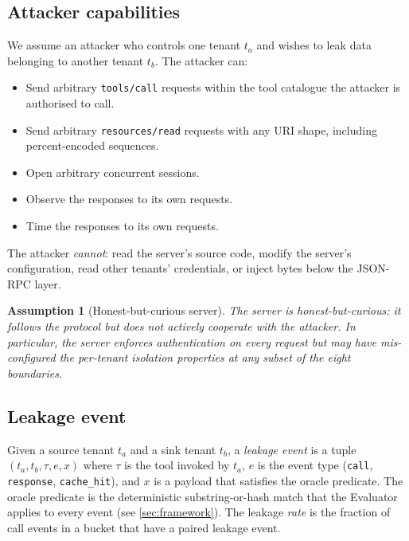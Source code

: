 \documentclass[sigconf, anonymous, natbib=false]{acmart}
\newtheorem{assumption}{Assumption}
\begin{document}
\subsection{Attacker capabilities}

We assume an attacker who controls one tenant $t_a$ and
wishes to leak data belonging to another tenant $t_b$. The
attacker can:

\begin{itemize}
  \item Send arbitrary \texttt{tools/call} requests within
        the tool catalogue the attacker is authorised to
        call.
  \item Send arbitrary \texttt{resources/read} requests
        with any URI shape, including percent-encoded
        sequences.
  \item Open arbitrary concurrent sessions.
  \item Observe the responses to its own requests.
  \item Time the responses to its own requests.
\end{itemize}

The attacker \emph{cannot}: read the server's source code,
modify the server's configuration, read other tenants'
credentials, or inject bytes below the JSON-RPC layer.

\begin{assumption}[Honest-but-curious server]
The server is honest-but-curious: it follows the protocol
but does not actively cooperate with the attacker. In
particular, the server enforces authentication on every
request but may have mis-configured the per-tenant
isolation properties at any subset of the eight boundaries.
\end{assumption}

\subsection{Leakage event}

\begin{definition}\label{def:leak}
Given a source tenant $t_a$ and a sink tenant $t_b$, a
\emph{leakage event} is a tuple $(t_a, t_b, \tau, e, x)$
where $\tau$ is the tool invoked by $t_a$, $e$ is the
event type (\texttt{call}, \texttt{response},
\texttt{cache\_hit}), and $x$ is a payload that satisfies
the oracle predicate. The oracle predicate is the
deterministic substring-or-hash match that the Evaluator
applies to every event (see \cref{sec:framework}). The
leakage \emph{rate} is the fraction of call events in a
bucket that have a paired leakage event.
\end{definition}
\end{document}
